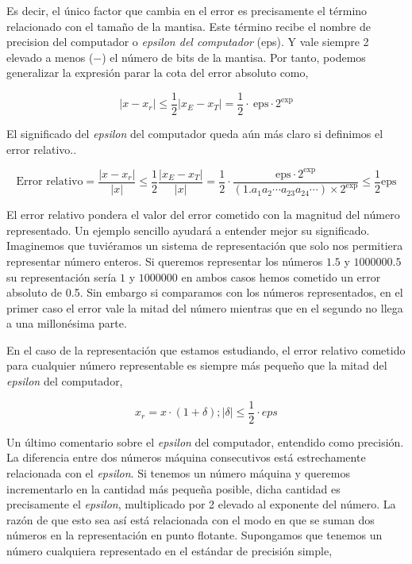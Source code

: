 \begin{paracol}{2}
 Es decir, el único factor que cambia en el error es precisamente el término relacionado con el tamaño de la mantisa. Este término recibe el nombre de precision del computador o \emph{epsilon del computador} (eps). Y vale siempre 2 elevado a menos ($-$) el  número de bits de la mantisa. Por tanto, podemos generalizar la expresión parar la cota del error absoluto como,
\end{paracol}

  \begin{equation*}
\vert x-x_r \vert \leq \frac{1}{2}\vert x_E-x_T \vert= \frac{1}{2}\cdot\ \text{eps}\cdot2^\text{exp}
\end{equation*}
\begin{paracol}{2}
El significado del \emph{epsilon} del computador queda aún más claro si definimos el error relativo..
\end{paracol}
\begin{equation*}
\text{Error relativo}=\frac{\vert x-x_r \vert}{\vert x \vert} \leq \frac{1}{2}\frac{\vert x_E-x_T \vert}{\vert x \vert}= \frac{1}{2}\cdot \frac{\text{eps}\cdot2^\text{exp}}{(1.a_1a_2\cdots a_{23}a_{24}\cdots)\times2^{\text{exp}}}\leq \frac{1}{2}\text{eps}
\end{equation*}
\begin{paracol}{2}
El error relativo pondera el valor del error cometido con la magnitud del número representado.  Un ejemplo sencillo ayudará a entender mejor su significado. Imaginemos que tuviéramos un sistema de representación que solo nos permitiera representar número enteros. Si queremos representar los números $1.5$ y $1000000.5$ su representación sería $1$ y $1000000$ en ambos casos hemos cometido un error absoluto de 0.5. Sin embargo si comparamos con los números representados, en el primer caso el error vale la mitad del número mientras que en el segundo no llega a una millonésima parte.

En el caso de la representación que estamos estudiando, el error relativo cometido para cualquier número representable es siempre más pequeño que la mitad del \emph{epsilon} del computador,
\end{paracol}

\begin{equation*}
x_r=x\cdot (1+ \delta); | \delta| \leq \frac{1}{2}\cdot eps
\end{equation*}

\begin{paracol}{2}
Un último comentario sobre el \emph{epsilon} del computador, entendido como precisión. La diferencia entre dos números máquina consecutivos está estrechamente  relacionada con el \emph{epsilon}. Si tenemos un número máquina y queremos incrementarlo en la cantidad más pequeña posible, dicha cantidad es precisamente el \emph{epsilon}, multiplicado por 2 elevado al exponente del número. La razón de que esto sea así está relacionada con el modo en que se suman dos números en la representación en punto flotante. Supongamos que tenemos un número cualquiera representado en el estándar de precisión simple,
\end{paracol}

